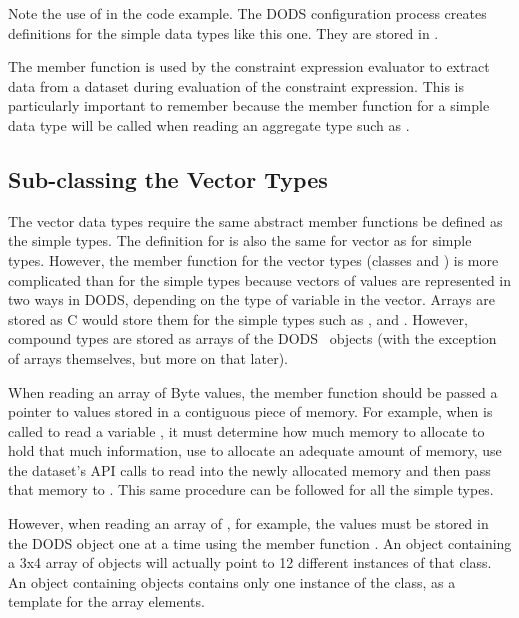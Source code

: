 Note the use of  in the code example.  The DODS
configuration process creates definitions for the simple data types
like this one. They are stored in .

The  member function is used by the constraint expression
evaluator to extract data from a dataset during evaluation of the
constraint expression.  This is particularly important to remember
because the  member function for a simple data type will be
called when reading an aggregate type such as .

\subsection{Sub-classing the Vector Types}

The vector data types require the same abstract member functions be
defined as the simple types. The definition for 
is also the same for vector as for simple types.  However, the
 member function for the vector types (classes 
and ) is more complicated than for the simple types
because vectors of values are represented in two ways in DODS,
depending on the type of variable in the vector. Arrays are stored as
C would store them for the simple types such as ,
 and .  However, compound types are stored
as arrays of the DODS \Cpp\ objects (with the exception of arrays
themselves, but more on that later).

When reading an array of Byte values, the  member function
should be passed a pointer to values stored in a contiguous piece of
memory. For example, when  is called to read a variable
, it must determine how much memory to allocate to
hold that much information, use  to allocate an adequate
amount of memory, use the dataset's API calls to read
 into the newly allocated memory and then pass that
memory to . This same procedure can be followed for all
the simple types.

However, when reading an array of , for example, the
values must be stored in the DODS  object one at a time
using the  member function . An
 object containing a 3x4 array of 
objects will actually point to 12 different instances of that class.
An  object containing  objects contains
only one instance of the  class, as a template for the
array elements.


